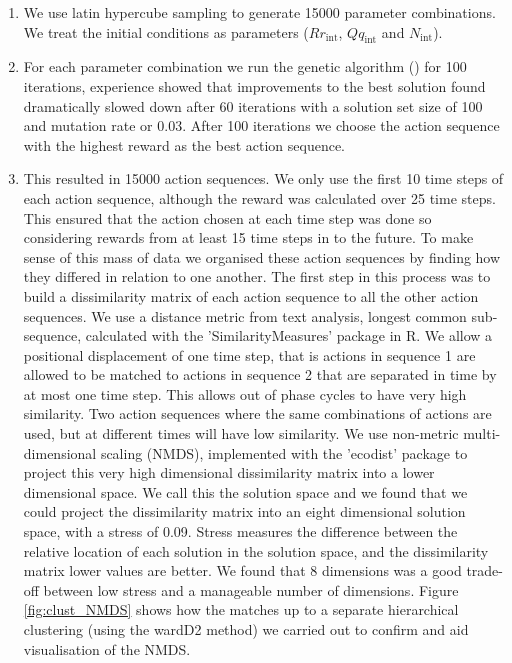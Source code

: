 \documentclass[12pt, a4paper]{article}
\begin{document}
\begin{enumerate}
\item We use latin hypercube sampling to generate 15000 parameter combinations. We treat the initial conditions as parameters ($Rr_\text{int}$, $Qq_\text{int}$ and $N_\text{int}$). 
\item For each parameter combination we run the genetic algorithm () for 100 iterations, experience showed that improvements to the best solution found dramatically slowed down after 60 iterations with a solution set size of 100 and mutation rate or 0.03. After 100 iterations we choose the action sequence with the highest reward as the best action sequence.     
\item This resulted in 15000 action sequences. We only use the first 10 time steps of each action sequence, although the reward was calculated over 25 time steps. This ensured that the action chosen at each time step was done so considering rewards from at least 15 time steps in to the future. To make sense of this mass of data we organised these action sequences by finding how they differed in relation to one another. The first step in this process was to build a dissimilarity matrix of each action sequence to all the other action sequences. We use a distance metric from text analysis, longest common sub-sequence, calculated with the 'SimilarityMeasures' \citep{Tooh2015} package in R. We allow a positional displacement of one time step, that is actions in sequence 1 are allowed to be matched to actions in sequence 2 that are separated in time by at most one time step. This allows out of phase cycles to have very high similarity. Two action sequences where the same combinations of actions are used, but at different times will have low similarity. We use non-metric multi-dimensional scaling (NMDS), implemented with the 'ecodist' package \citep{Gosl2007} to project this very high dimensional dissimilarity matrix into a lower dimensional space. We call this the solution space and we found that we could project the dissimilarity matrix into an eight dimensional solution space, with a stress of 0.09. Stress measures the difference between the relative location of each solution in the solution space, and the dissimilarity matrix lower values are better. We found that 8 dimensions was a good trade-off between low stress and a manageable number of dimensions. Figure \ref{fig:clust_NMDS} shows how the matches up to a separate hierarchical clustering (using the wardD2 method) we carried out to confirm and aid visualisation of the NMDS.                  

\end{enumerate}
\end{document}
